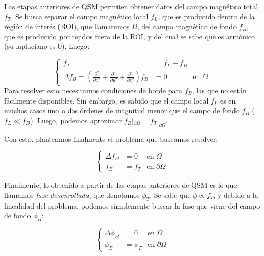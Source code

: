 Las etapas anteriores de QSM permiten obtener datos del campo magnético total $f_T$. Se busca separar el campo magnético local $f_L$, que es producido dentro de la región de interés (ROI), que llamaremos $\Omega$, del campo magnético de fondo $f_B$, que es producido por tejidos fuera de la ROI, y del cual se sabe que es armónico (su laplaciano es $0$). Luego:

\[
\left\{
\begin{array}{rll}
     f_T & = f_L + f_B & \\
     \Delta f_B = \displaystyle{\left(\frac{\partial^2}{\partial x^2} + \frac{\partial^2}{\partial y^2} + \frac{\partial^2}{\partial z^2}\right)} f_B & = 0 & \text{en} \,\, \Omega
\end{array}
\right.
\]
Para resolver esto necesitamos condiciones de borde para $f_B$, las que no están fácilmente disponibles. Sin embargo, es sabido que el campo local $f_L$ es en muchos casos uno o dos órdenes de magnitud menor que el campo de fondo $f_B$ ($f_L \ll f_B$). Luego, podemos aproximar $f_B|_{\partial \Omega} = f_T|_{\partial \Omega}$.

Con esto, planteamos finalmente el problema que buscamos resolver:

\[
\left\{
\begin{array}{rll}
\Delta f_B &= 0 & \text{en} \,\, \Omega \\
f_B &= f_T & \text{en} \,\, \partial \Omega
\end{array}
\right.
\]

Finalmente, lo obtenido a partir de las etapas anteriores de QSM es lo que llamamos \textit{fase desenrollada}, que denotamos $\phi_T$. Se sabe que $\phi \propto f_T$, y debido a la linealidad del problema, podemos simplemente buscar la fase que viene del campo de fondo $\phi_B$:

\[
\left\{
\begin{array}{rll}
\Delta \phi_B &= 0 & \text{en} \,\, \Omega \\
\phi_B &= \phi_T & \text{en} \,\, \partial \Omega
\end{array}
\right.
\]

